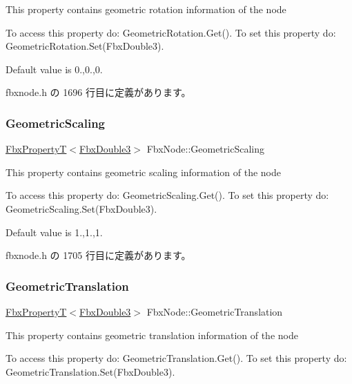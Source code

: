 This property contains geometric rotation information of the node

To access this property do\+: Geometric\+Rotation.\+Get(). To set this property do\+: Geometric\+Rotation.\+Set(\+Fbx\+Double3).

Default value is 0.,0.,0. 

 fbxnode.\+h の 1696 行目に定義があります。

\mbox{\label{class_fbx_node_abc071af68acc0b2fa5fd98ce8d40471f}} 
\subsubsection{\texorpdfstring{Geometric\+Scaling}{GeometricScaling}}
{\footnotesize\ttfamily \hyperlink{class_fbx_property_t}{Fbx\+PropertyT}$<$\hyperlink{fbxtypes_8h_ae0a96f14cde566774c7553aa7523b7a7}{Fbx\+Double3}$>$ Fbx\+Node\+::\+Geometric\+Scaling}

This property contains geometric scaling information of the node

To access this property do\+: Geometric\+Scaling.\+Get(). To set this property do\+: Geometric\+Scaling.\+Set(\+Fbx\+Double3).

Default value is 1.,1.,1. 

 fbxnode.\+h の 1705 行目に定義があります。

\mbox{\label{class_fbx_node_a34e3c56f86ea2484d512bfbaf2958bb6}} 
\subsubsection{\texorpdfstring{Geometric\+Translation}{GeometricTranslation}}
{\footnotesize\ttfamily \hyperlink{class_fbx_property_t}{Fbx\+PropertyT}$<$\hyperlink{fbxtypes_8h_ae0a96f14cde566774c7553aa7523b7a7}{Fbx\+Double3}$>$ Fbx\+Node\+::\+Geometric\+Translation}

This property contains geometric translation information of the node

To access this property do\+: Geometric\+Translation.\+Get(). To set this property do\+: Geometric\+Translation.\+Set(\+Fbx\+Double3).

